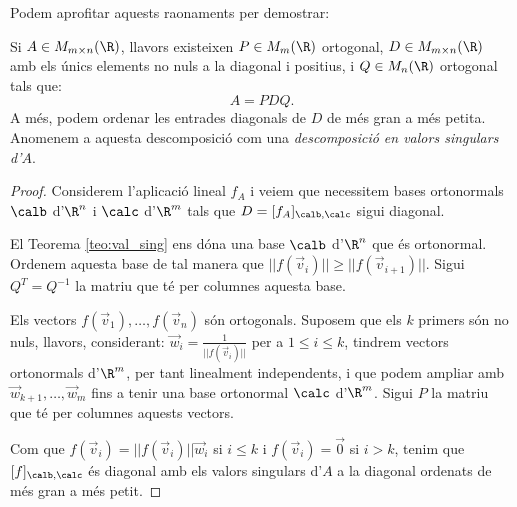 Podem aprofitar aquests raonaments per demostrar:
\begin{teorema}\label{teo:SVD}
Si $A\in M_{m\times n}(\R)$, llavors existeixen $P \in M_{m}(\R)$ ortogonal, $D\in M_{m\times n}(\R)$ amb els únics elements no nuls a la diagonal i positius, i $Q\in M_n(\R)$ ortogonal tals que:
\[
A=PDQ.
\]
A més, podem ordenar les entrades diagonals de $D$ de més gran a més petita. Anomenem a aquesta descomposició com una \emph{descomposició en valors singulars d'$A$}.
\end{teorema}
\begin{proof}
Considerem l'aplicació lineal $f_A$ i veiem que necessitem bases ortonormals $\calb$ d'$\R^n$ i $\calc$ d'$\R^m$ tals que $D=[f_A]_{\calb,\calc}$ sigui diagonal.

El Teorema \ref{teo:val_sing} ens dóna una base $\calb$ d'$\R^n$ que és ortonormal. Ordenem aquesta base de tal manera que $||f(\vec v_i)||\geq ||f(\vec v_{i+1})||$. Sigui $Q^T=Q^{-1}$ la matriu que té per columnes aquesta base.

Els vectors $f(\vec v_1), \dots, f(\vec v_n)$ són ortogonals. Suposem que els $k$ primers són no nuls, llavors, considerant:
$\vec w_i=\frac{1}{||f(\vec v_i)||}$ per a $1\leq i \leq k$, tindrem vectors ortonormals d'$\R^m$, per tant linealment independents, i que podem ampliar amb $\vec w_{k+1}, \dots, \vec w_m$ fins a tenir una base ortonormal $\calc$ d'$\R^m$. Sigui $P$ la matriu que té per columnes aquests vectors.

Com que $f(\vec v_i)=||f(\vec v_i)|| \vec w_i$ si $i\leq k$ i $f(\vec v_i)=\vec 0$ si $i>k$, tenim que $[f]_{\calb,\calc}$ és diagonal amb els valors singulars d'$A$ a la diagonal ordenats de més gran a més petit.
\end{proof}

